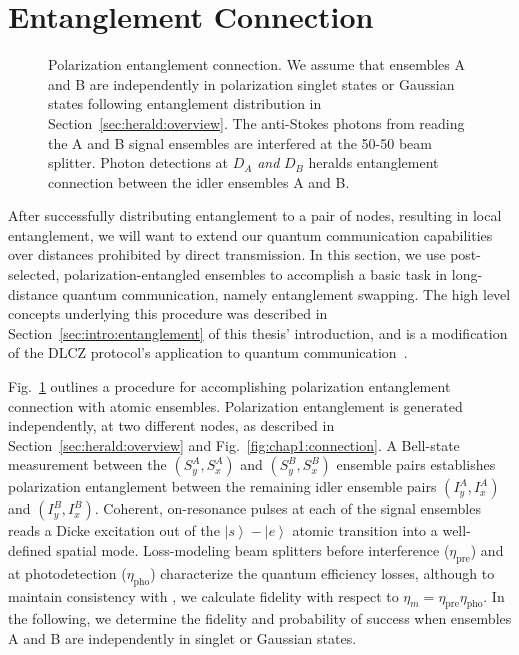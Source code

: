 \documentclass[aps,twocolumn,secnumarabic,amsmath,amssymb,pra,groupedaddress,
showpacs, showkeys,draft]{revtex4-1}
\newcommand{\ket}[1]{\left|#1\right\rangle}
\newcommand{\pna}[1]{\left(#1\right)}
\begin{document}
\section{Entanglement Connection~\label{sec:herald:communication}}

\begin{figure}[htb]
	\centering
	\resizebox{5.00in}{!}{}
	\caption{Polarization entanglement connection. We assume that ensembles A and B are independently in polarization singlet states or Gaussian states following entanglement distribution in Section~\ref{sec:herald:overview}. The anti-Stokes photons from reading the A and B signal ensembles are interfered at the 50-50 beam splitter. Photon detections at $D_A$ \emph{and} $D_B$ heralds entanglement connection between the idler ensembles A and B.
	\label{fig:entanglement_connection}}
\end{figure}

After successfully distributing entanglement to a pair of nodes, resulting in
local entanglement, we will want to extend our quantum communication
capabilities over distances prohibited by direct transmission.  In this
section, we use post-selected, polarization-entangled ensembles to accomplish a
basic task in long-distance quantum communication, namely entanglement
swapping. The high level concepts underlying this procedure was described in
Section~\ref{sec:intro:entanglement} of this thesis' introduction, and
is a modification of the DLCZ protocol's application to quantum
communication~\cite{nature35106500}.

Fig.~\ref{fig:entanglement_connection} outlines a procedure for accomplishing
polarization entanglement connection with atomic ensembles. Polarization
entanglement is generated independently, at two different nodes, as described
in Section~\ref{sec:herald:overview} and Fig.~\ref{fig:chap1:connection}. A
Bell-state measurement between the $\pna{S_y^A,S_x^A}$ and $\pna{S_y^B,S_x^B}$
ensemble pairs establishes polarization entanglement between the remaining
idler ensemble pairs $\pna{I_y^A,I_x^A}$ and $\pna{I_y^B,I_x^B}$. Coherent,
on-resonance pulses at each of the signal ensembles reads a Dicke excitation
out of the $\ket{s}-\ket{e}$ atomic transition into a well-defined spatial
mode. Loss-modeling beam splitters before interference ($\eta_{\textrm{pre}}$)
and at photodetection ($\eta_{\textrm{pho}}$) characterize the quantum
efficiency losses, although to maintain consistency with
\cite{PhysRevA.73.042303}, we calculate fidelity with respect to
$\eta_{m}=\eta_{\textrm{pre}}\eta_{\textrm{pho}}$. In the
following, we determine the fidelity and probability of success when ensembles
A and B are independently in singlet or Gaussian states.
\end{document}
